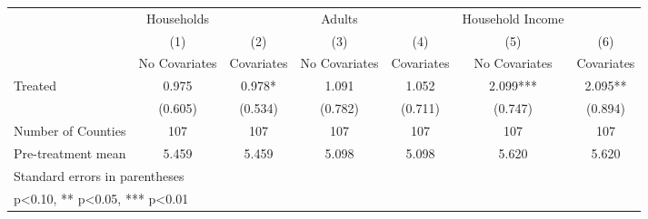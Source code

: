 {
\def\sym#1{\ifmmode^{#1}\else\(^{#1}\)\fi}
\begin{tabular}{l*{6}{c}}
\hline\hline
            &  Households   &               &      Adults   &               &Household Income   &               \\
            &\multicolumn{1}{c}{(1)}&\multicolumn{1}{c}{(2)}&\multicolumn{1}{c}{(3)}&\multicolumn{1}{c}{(4)}&\multicolumn{1}{c}{(5)}&\multicolumn{1}{c}{(6)}\\
            &\multicolumn{1}{c}{No Covariates}&\multicolumn{1}{c}{Covariates}&\multicolumn{1}{c}{No Covariates}&\multicolumn{1}{c}{Covariates}&\multicolumn{1}{c}{No Covariates}&\multicolumn{1}{c}{Covariates}\\
\hline
Treated     &       0.975   &       0.978*  &       1.091   &       1.052   &       2.099***&       2.095** \\
            &     (0.605)   &     (0.534)   &     (0.782)   &     (0.711)   &     (0.747)   &     (0.894)   \\
\hline
Number of Counties&         107   &         107   &         107   &         107   &         107   &         107   \\
Pre-treatment mean&       5.459   &       5.459   &       5.098   &       5.098   &       5.620   &       5.620   \\
\hline\hline
\multicolumn{7}{l}{\footnotesize Standard errors in parentheses}\\
\multicolumn{7}{l}{\footnotesize * p<0.10, ** p<0.05, *** p<0.01}\\
\end{tabular}
}
